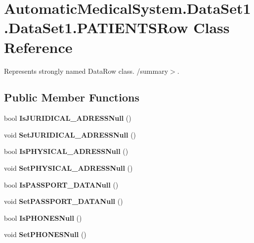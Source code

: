 \section{AutomaticMedicalSystem.DataSet1.DataSet1.PATIENTSRow Class Reference}
\label{class_automatic_medical_system_1_1_data_set1_1_1_p_a_t_i_e_n_t_s_row}
Represents strongly named DataRow class. /summary$>$.  


\subsection*{Public Member Functions}
\begin{CompactItemize}
\item 
bool \textbf{IsJURIDICAL\_\-ADRESSNull} ()\label{class_automatic_medical_system_1_1_data_set1_1_1_p_a_t_i_e_n_t_s_row_9f1f37bc3cbc6c6e5d466f82c050a74f}

\item 
void \textbf{SetJURIDICAL\_\-ADRESSNull} ()\label{class_automatic_medical_system_1_1_data_set1_1_1_p_a_t_i_e_n_t_s_row_301032c7429cd51482f32fe501d9f3cf}

\item 
bool \textbf{IsPHYSICAL\_\-ADRESSNull} ()\label{class_automatic_medical_system_1_1_data_set1_1_1_p_a_t_i_e_n_t_s_row_c60f3e71a71da4c8b519fb97d104d604}

\item 
void \textbf{SetPHYSICAL\_\-ADRESSNull} ()\label{class_automatic_medical_system_1_1_data_set1_1_1_p_a_t_i_e_n_t_s_row_165db36f8dc3cbd30e786ef9f8455ed2}

\item 
bool \textbf{IsPASSPORT\_\-DATANull} ()\label{class_automatic_medical_system_1_1_data_set1_1_1_p_a_t_i_e_n_t_s_row_25cef0de45a6d2d940a4f92b38bb79ad}

\item 
void \textbf{SetPASSPORT\_\-DATANull} ()\label{class_automatic_medical_system_1_1_data_set1_1_1_p_a_t_i_e_n_t_s_row_a4a4fd454f2549cac307140815e8f900}

\item 
bool \textbf{IsPHONESNull} ()\label{class_automatic_medical_system_1_1_data_set1_1_1_p_a_t_i_e_n_t_s_row_5c6d87b0e4cc2652847bd68fc2001c2a}

\item 
void \textbf{SetPHONESNull} ()\label{class_automatic_medical_system_1_1_data_set1_1_1_p_a_t_i_e_n_t_s_row_f64429f09b509a9b1dc152d60f4cd86e}


\end{CompactItemize}
